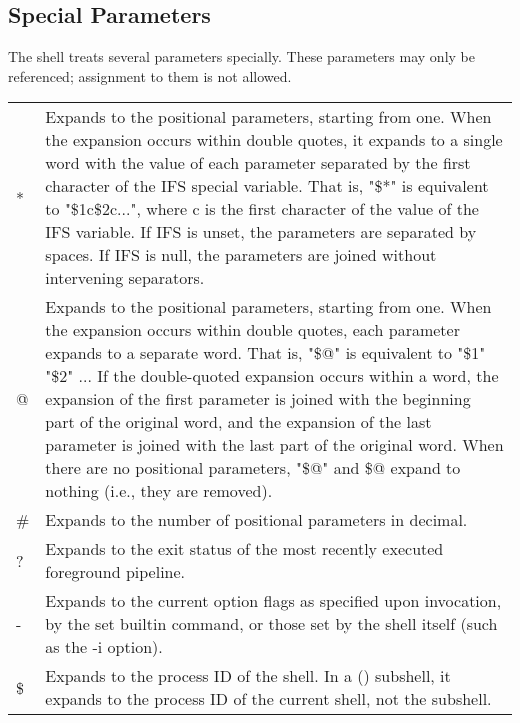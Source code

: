 \documentclass[11pt]{article}
\begin{document}
\subsection{Special Parameters}\label{sec:specialparameters}

The shell treats several parameters specially. These parameters may only be referenced; assignment to them is not allowed.

\begin{longtable}{p{}p{}}

* &
Expands to the positional parameters, starting from one. When the expansion occurs within double quotes, it expands to a single word with the value of each parameter separated by the first character of the IFS special variable. That is, "\$*" is equivalent to "\$1c\$2c...", where c is the first character of the value of the IFS variable. If IFS is unset, the parameters are separated by spaces. If IFS is null, the parameters are joined without intervening separators. \\

@ &

Expands to the positional parameters, starting from one. When the expansion occurs within double quotes, each parameter expands to a separate word. That is, "\$@" is equivalent to "\$1" "\$2" ... If the double-quoted expansion occurs within a word, the expansion of the first parameter is joined with the beginning part of the original word, and the expansion of the last parameter is joined with the last part of the original word. When there are no positional parameters, "\$@" and \$@ expand to nothing (i.e., they are removed). \\

\# &

Expands to the number of positional parameters in decimal. \\

? &

Expands to the exit status of the most recently executed foreground pipeline. \\

- &

Expands to the current option flags as specified upon invocation, by the set builtin command, or those set by the shell itself (such as the -i option). \\

\$ &

Expands to the process ID of the shell. In a () subshell, it expands to the process ID of the current shell, not the subshell. \\


\end{longtable}
\end{document}
